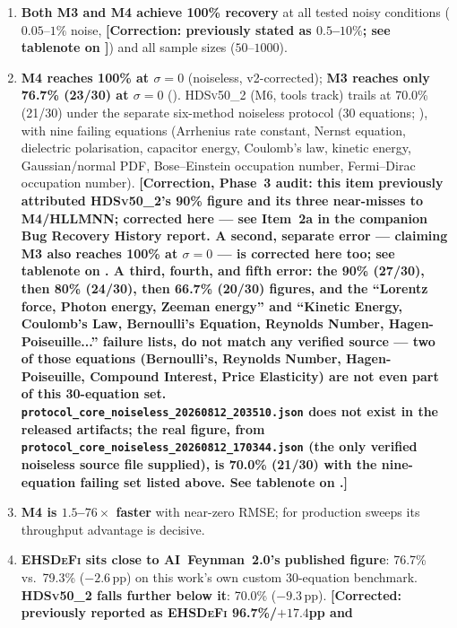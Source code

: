 \documentclass[twoside,11pt]{article}
\newcommand{\EHD}{\textsc{EHSDeFi}}
\newcommand{\HSL}{\textsc{HLLMNN}}
\newcommand{\HDS}{\textsc{HDSv50\_2}}
\begin{document}
\begin{enumerate}
  \item \textbf{Both M3 and M4 achieve 100\% recovery} at all tested noisy
    conditions ($0.05$--$1\%$ noise, \textbf{[Correction: previously stated
    as $0.5$--$10\%$; see tablenote on ]}) and all
    sample sizes ($50$--$1000$).
  \item \textbf{M4 reaches 100\% at $\sigma=0$} (noiseless, v2-corrected);
    \textbf{M3 reaches only 76.7\% (23/30) at $\sigma=0$}
    (). \HDS{} (M6, tools track) trails at 70.0\% (21/30)
    under the separate six-method noiseless protocol (30 equations;
    ), with nine failing equations (Arrhenius rate
    constant, Nernst equation, dielectric polarisation, capacitor energy,
    Coulomb's law, kinetic energy, Gaussian/normal PDF, Bose--Einstein
    occupation number, Fermi--Dirac occupation number).
    \textbf{[Correction, Phase~3 audit: this item previously attributed
    \HDS's 90\% figure and its three near-misses to M4/\HSL; corrected
    here --- see Item~2a in the companion Bug Recovery History report.
    A second, separate error --- claiming M3 also reaches 100\% at
    $\sigma=0$ --- is corrected here too; see tablenote on
    . A third, fourth, and fifth error: the 90\%
    (27/30), then 80\% (24/30), then 66.7\% (20/30) figures, and the
    ``Lorentz force, Photon energy, Zeeman energy'' and ``Kinetic Energy,
    Coulomb's Law, Bernoulli's Equation, Reynolds Number,
    Hagen-Poiseuille...'' failure lists, do not match any verified
    source --- two of those equations (Bernoulli's, Reynolds Number,
    Hagen-Poiseuille, Compound Interest, Price Elasticity) are not even
    part of this 30-equation set.
    \texttt{protocol\_core\_noiseless\_20260812\_203510.json} does not
    exist in the released artifacts; the real figure, from
    \texttt{protocol\_core\_noiseless\_20260812\_170344.json} (the only
    verified noiseless source file supplied), is 70.0\% (21/30) with the
    nine-equation failing set listed above. See tablenote on
    .]}
  \item \textbf{M4 is $1.5$--$76\times$ faster} with near-zero RMSE; for
    production sweeps its throughput advantage is decisive.
  \item \textbf{\EHD{} sits close to AI~Feynman~2.0's published figure}:
    76.7\% vs.\ 79.3\% ($-2.6$\,pp) on this work's own custom 30-equation
    benchmark. \textbf{\HDS{} falls further below it}: 70.0\% ($-9.3$\,pp).
    \textbf{[Corrected: previously reported as \EHD{} 96.7\%/$+17.4$pp and
}
\end{enumerate}
\end{document}
